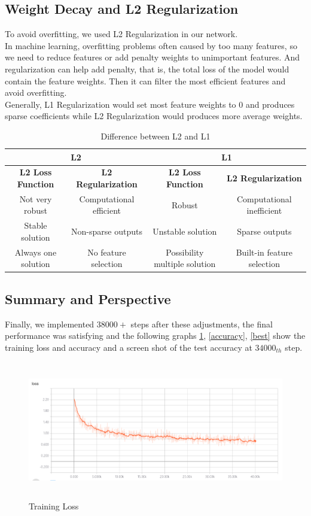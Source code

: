 \documentclass[hyperref]{article}
\theoremstyle{nonumberplain}
\begin{document}
\subsection{Weight Decay and L2 Regularization}
To avoid overfitting, we used L2 Regularization in our network. \\
In machine learning, overfitting problems often caused by too many features, so we need to reduce features or add penalty weights to unimportant features. And regularization can help add penalty, that is, the total loss of the model would contain the feature weights. Then it can filter the most efficient features and avoid overfitting. \\
Generally, L1 Regularization would set most feature weights to $0$ and  produces sparse coefficients while L2 Regularization would produces more average weights.
\begin{table}[h]
\caption{Difference between L2 and L1}
\centering
\begin{tabular}{cc|cc}
\hline
\multicolumn{2}{c|}{\bf{L2}} & \multicolumn{2}{c}{\bf{L1}} \\
\hline
\bf{L2 Loss Function} & \bf{L2 Regularization} & \bf{L2 Loss Function} & \bf{L2 Regularization} \\
\hline
Not very robust & Computational efficient & Robust & Computational inefficient \\
Stable solution & Non-sparse outputs & Unstable solution & Sparse outputs  \\
Always one solution & No feature selection & Possibility multiple solution & Built-in feature selection \\
\hline
\end{tabular}
\end{table}

\subsection{Summary and Perspective}
Finally, we implemented $38000+$ steps after these adjustments, the final performance was satisfying and the following graphs \ref{loss}, \ref{accuracy}, \ref{best} show the training loss and accuracy and a screen shot of the test accuracy at $34000_{th}$ step.

\begin{figure}[htbp]
\centering
\includegraphics[width=440pt,height=170pt]{loss.png}
\caption{Training Loss}
\label{loss}
\end{figure}
\end{document}
